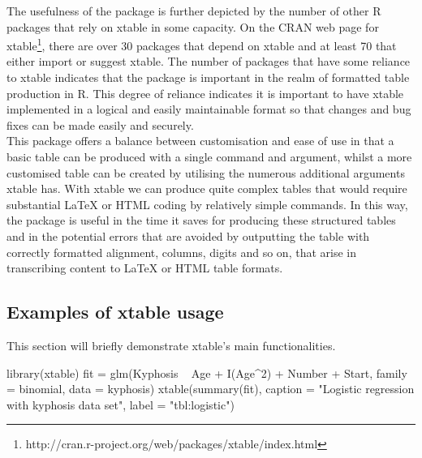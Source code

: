 \documentclass{memoir}\usepackage[]{graphicx}\usepackage[]{color}
\newcommand{\pkg}[1]{{\fontseries{b}\selectfont #1}}
\newcommand{\latex}{\LaTeX\xspace}
\begin{document}
The usefulness of the package is further depicted by the number of other R packages that rely on \pkg{xtable} in some capacity. On the CRAN web page for \pkg{xtable}\footnote{http://cran.r-project.org/web/packages/xtable/index.html}, there are over 30 packages that depend on \pkg{xtable} and at least 70 that either import or suggest \pkg{xtable}. The number of packages that have some reliance to \pkg{xtable} indicates that the package is important in the realm of formatted table production in R. This degree of reliance indicates it is important to have \pkg{xtable} implemented in a logical and easily maintainable format so that changes and bug fixes can be made easily and securely.\\ 

This package offers a balance between customisation and ease of use in that a basic table can be produced with a single command and argument, whilst a more customised table can be created by utilising the numerous additional arguments \pkg{xtable} has. With \pkg{xtable} we can produce quite complex tables that would require substantial \latex or HTML coding by relatively simple commands. In this way, the package is useful in the time it saves for producing these structured tables and in the potential errors that are avoided by outputting the table with correctly formatted alignment, columns, digits and so on, that arise in transcribing content to \latex or HTML table formats. 

\subsection{Examples of xtable usage}

This section will briefly demonstrate \pkg{xtable}'s main functionalities.

\vspace{1mm}


\begin{codelisting}[caption={logistic regression table input},language=R]
library(xtable)
fit = glm(Kyphosis ~ Age + I(Age^2) + Number + Start,
          family = binomial, data = kyphosis)
xtable(summary(fit), caption = 
	"Logistic regression with kyphosis data set",
  label = "tbl:logistic")
\end{codelisting}
\end{document}
